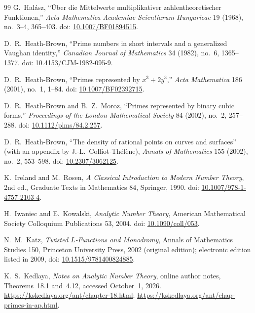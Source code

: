 \documentclass[11pt,a4paper]{article}
\begin{document}
\begin{thebibliography}{99}
G.~Hal\'asz, ``\"Uber die Mittelwerte multiplikativer zahlentheoretischer
Funktionen,'' \emph{Acta Mathematica Academiae Scientiarum Hungaricae}
19 (1968), no.\ 3--4, 365--403. doi:
\href{https://doi.org/10.1007/BF01894515}{10.1007/BF01894515}.

D.~R.~Heath-Brown, ``Prime numbers in short intervals and a
generalized Vaughan identity,''
\emph{Canadian Journal of Mathematics} 34 (1982), no.\ 6, 1365--1377.
doi: \href{https://doi.org/10.4153/CJM-1982-095-9}{10.4153/CJM-1982-095-9}.

D.~R.~Heath-Brown, ``Primes represented by $x^3+2y^3$,''
\emph{Acta Mathematica} 186 (2001), no.\ 1, 1--84. doi:
\href{https://doi.org/10.1007/BF02392715}{10.1007/BF02392715}.

D.~R.~Heath-Brown and B.~Z.~Moroz, ``Primes represented by binary
cubic forms,'' \emph{Proceedings of the London Mathematical Society}
84 (2002), no.\ 2, 257--288. doi:
\href{https://doi.org/10.1112/plms/84.2.257}{10.1112/plms/84.2.257}.

D.~R.~Heath-Brown, ``The density of rational points on curves and
surfaces'' (with an appendix by J.-L.~Colliot-Th\'el\`ene),
\emph{Annals of Mathematics} 155 (2002), no.\ 2, 553--598. doi:
\href{https://doi.org/10.2307/3062125}{10.2307/3062125}.

K.~Ireland and M.~Rosen, \emph{A Classical Introduction to Modern
Number Theory}, 2nd ed., Graduate Texts in Mathematics 84,
Springer, 1990. doi:
\href{https://doi.org/10.1007/978-1-4757-2103-4}{10.1007/978-1-4757-2103-4}.

H.~Iwaniec and E.~Kowalski, \emph{Analytic Number Theory},
American Mathematical Society Colloquium Publications 53, 2004. doi:
\href{https://doi.org/10.1090/coll/053}{10.1090/coll/053}.

N.~M.~Katz, \emph{Twisted $L$-Functions and Monodromy},
Annals of Mathematics Studies 150, Princeton University Press,
2002 (original edition); electronic edition listed in 2009, doi:
\href{https://doi.org/10.1515/9781400824885}{10.1515/9781400824885}.

K.~S.~Kedlaya, \emph{Notes on Analytic Number Theory},
online author notes, Theorems~18.1 and~4.12, accessed October~1, 2026.
\url{https://kskedlaya.org/ant/chapter-18.html};
\url{https://kskedlaya.org/ant/chap-primes-in-ap.html}.


\end{thebibliography}
\end{document}
